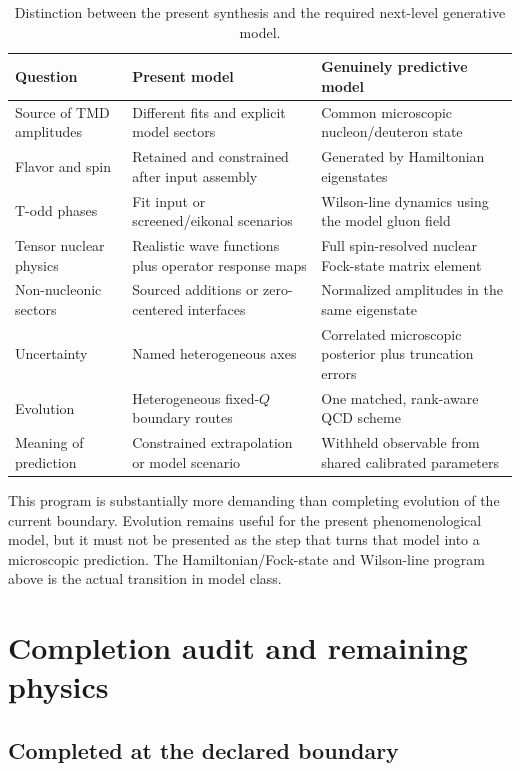 \documentclass[11pt]{article}
\begin{document}
\begin{table}[ht]
\centering
\caption{Distinction between the present synthesis and the required
next-level generative model.}
\label{tab:model-class-comparison}
\small
\begin{tabularx}{\textwidth}{L{0.22\textwidth}Y Y}
\toprule
Question & Present model & Genuinely predictive model \\
\midrule
Source of TMD amplitudes &
Different fits and explicit model sectors &
Common microscopic nucleon/deuteron state \\
Flavor and spin &
Retained and constrained after input assembly &
Generated by Hamiltonian eigenstates \\
T-odd phases &
Fit input or screened/eikonal scenarios &
Wilson-line dynamics using the model gluon field \\
Tensor nuclear physics &
Realistic wave functions plus operator response maps &
Full spin-resolved nuclear Fock-state matrix element \\
Non-nucleonic sectors &
Sourced additions or zero-centered interfaces &
Normalized amplitudes in the same eigenstate \\
Uncertainty &
Named heterogeneous axes &
Correlated microscopic posterior plus truncation errors \\
Evolution &
Heterogeneous fixed-\(Q\) boundary routes &
One matched, rank-aware QCD scheme \\
Meaning of prediction &
Constrained extrapolation or model scenario &
Withheld observable from shared calibrated parameters \\
\bottomrule
\end{tabularx}
\end{table}

This program is substantially more demanding than completing evolution of
the current boundary.  Evolution remains useful for the present
phenomenological model, but it must not be presented as the step that turns
that model into a microscopic prediction.  The Hamiltonian/Fock-state and
Wilson-line program above is the actual transition in model class.

\section{Completion audit and remaining physics}
\label{sec:audit}

\subsection{Completed at the declared boundary}
\end{document}
